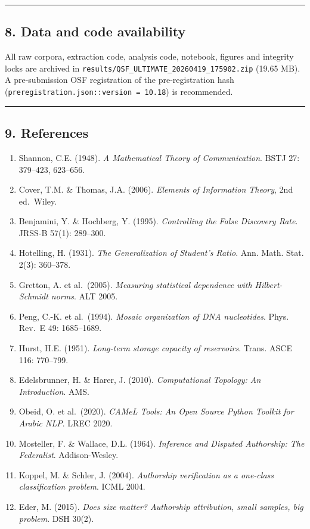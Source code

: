 \documentclass[
]{article}
\providecommand{\tightlist}{%
  \setlength{\itemsep}{0pt}\setlength{\parskip}{0pt}}
\begin{document}
\begin{center}\rule{0.5\linewidth}{0.5pt}\end{center}

\subsection{8. Data and code
availability}\label{data-and-code-availability}

All raw corpora, extraction code, analysis code, notebook, figures and
integrity locks are archived in
\texttt{results/QSF\_ULTIMATE\_20260419\_175902.zip} (19.65 MB). A
pre-submission OSF registration of the pre-registration hash
(\texttt{preregistration.json::version\ =\ 10.18}) is recommended.

\begin{center}\rule{0.5\linewidth}{0.5pt}\end{center}

\subsection{9. References}\label{references}

\begin{enumerate}
\def\labelenumi{\arabic{enumi}.}
\tightlist
\item
  Shannon, C.E. (1948). \emph{A Mathematical Theory of Communication}.
  BSTJ 27: 379--423, 623--656.
\item
  Cover, T.M. \& Thomas, J.A. (2006). \emph{Elements of Information
  Theory}, 2nd ed.~Wiley.
\item
  Benjamini, Y. \& Hochberg, Y. (1995). \emph{Controlling the False
  Discovery Rate}. JRSS-B 57(1): 289--300.
\item
  Hotelling, H. (1931). \emph{The Generalization of Student's Ratio}.
  Ann. Math. Stat. 2(3): 360--378.
\item
  Gretton, A. et al.~(2005). \emph{Measuring statistical dependence with
  Hilbert-Schmidt norms}. ALT 2005.
\item
  Peng, C.-K. et al.~(1994). \emph{Mosaic organization of DNA
  nucleotides}. Phys. Rev.~E 49: 1685--1689.
\item
  Hurst, H.E. (1951). \emph{Long-term storage capacity of reservoirs}.
  Trans. ASCE 116: 770--799.
\item
  Edelsbrunner, H. \& Harer, J. (2010). \emph{Computational Topology: An
  Introduction}. AMS.
\item
  Obeid, O. et al.~(2020). \emph{CAMeL Tools: An Open Source Python
  Toolkit for Arabic NLP}. LREC 2020.
\item
  Mosteller, F. \& Wallace, D.L. (1964). \emph{Inference and Disputed
  Authorship: The Federalist}. Addison-Wesley.
\item
  Koppel, M. \& Schler, J. (2004). \emph{Authorship verification as a
  one-class classification problem}. ICML 2004.
\item
  Eder, M. (2015). \emph{Does size matter? Authorship attribution, small
  samples, big problem}. DSH 30(2).
\end{enumerate}
\end{document}
